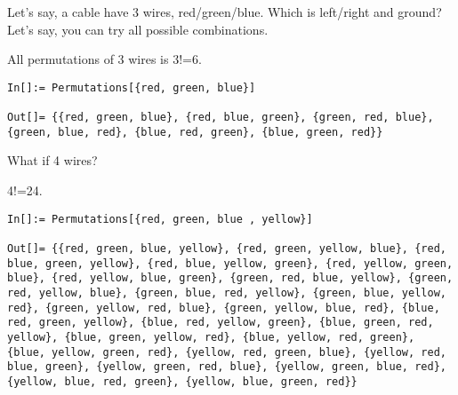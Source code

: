 
Let's say, a cable have 3 wires, red/green/blue.
Which is left/right and ground?
Let's say, you can try all possible combinations.

All permutations of 3 wires is 3!=6.

\begin{lstlisting}[caption=Wolfram Mathematica]
In[]:= Permutations[{red, green, blue}]

Out[]= {{red, green, blue}, {red, blue, green}, {green, red, blue}, {green, blue, red}, {blue, red, green}, {blue, green, red}}
\end{lstlisting}

What if 4 wires?

4!=24.

\begin{lstlisting}[caption=Wolfram Mathematica]
In[]:= Permutations[{red, green, blue , yellow}]

Out[]= {{red, green, blue, yellow}, {red, green, yellow, blue}, {red, blue, green, yellow}, {red, blue, yellow, green}, {red, yellow, green, blue}, {red, yellow, blue, green}, {green, red, blue, yellow}, {green, red, yellow, blue}, {green, blue, red, yellow}, {green, blue, yellow, red}, {green, yellow, red, blue}, {green, yellow, blue, red}, {blue, red, green, yellow}, {blue, red, yellow, green}, {blue, green, red, yellow}, {blue, green, yellow, red}, {blue, yellow, red, green}, {blue, yellow, green, red}, {yellow, red, green, blue}, {yellow, red, blue, green}, {yellow, green, red, blue}, {yellow, green, blue, red}, {yellow, blue, red, green}, {yellow, blue, green, red}}
\end{lstlisting}

